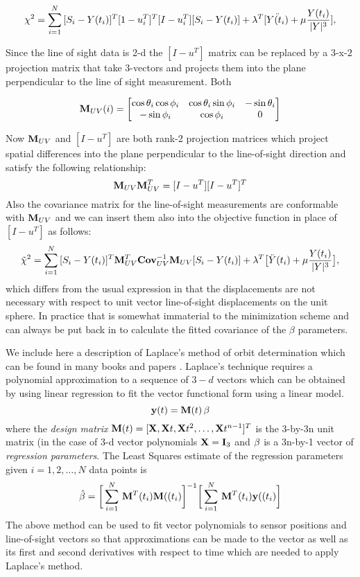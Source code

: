 $$\chi^2 = \sum_{i=1}^N\, [S_i - Y(t_i)]^T [1-u_i^T]^T [I-u_i^T][S_i - Y(t_i)]  + \lambda^T[\ddot{Y(t_i)} + \mu {Y(t_i)\over |Y|^3}],$$

Since the line of sight data is 2-d the $[I-u^T]$ matrix can be replaced by a $3$-x-$2$ projection matrix that take 3-vectors and projects them into the plane perpendicular to the line of sight measurement. Both

$${\bf M}_{UV}(i) =
\begin{bmatrix}
\cos\theta_i\cos\phi_i & \cos\theta_i\sin\phi_i & -\sin\theta_i \\
-\sin\phi_i & \cos\phi_i & 0\\
\end{bmatrix}
$$

Now ${\bf M}_{UV}$ and $[I - u^T]$ are both rank-2 projection matrices which project spatial differences into the plane perpendicular to the line-of-sight direction and satisfy the following relationship: 
$${\bf M}_{UV} {\bf M}^T_{UV} = [I - u^T][I-u^T]^T$$Also the covariance matrix for the line-of-sight measurements are conformable with ${\bf M}_{UV}$ and we can insert them also into the objective function in place of $[I-u^T]$ as follows:
$$\tilde{\chi}^2 = \sum_{i=1}^N\, [S_i - Y(t_i)]^T {\bf M}^T_{UV}{\bf Cov}^{-1}_{UV} {\bf M}_{UV} [S_i - Y(t_i)]  + \lambda^T\big[\ddot{Y}(t_i) + \mu {Y(t_i)\over |Y|^3}\big],$$ which differs from the usual expression in that the displacements are not necessary with respect to unit vector line-of-sight displacements on the unit sphere. In practice that is somewhat immaterial to the minimization scheme and can always be put back in to calculate the fitted covariance of the $\beta$ parameters. 

We include here a description of Laplace's method of orbit determination which can be found in many books\cite{Bate} and papers \cite{Bell}. Laplace's technique requires a polynomial approximation to a sequence of $3-d$ vectors which can be obtained by using linear regression to fit the vector functional form using a linear model\cite{Rencher}.
$${\bf y}(t) = {\bf M(}t)\, {\bf \beta}$$where the {\it design matrix} ${\bf M}(t) = [{\bf X},{\bf X}t,{\bf X}t^2,\hdots,{\bf X}t^{n-1}]^T$ is the 3-by-3n unit matrix (in the case of 3-d vector polynomials ${\bf X}  = {\bf I}_3$ and $\bf \beta$ is a 3n-by-1 vector of {\it regression parameters}. The Least Squares estimate of the regression parameters given $i=1,2,\hdots, N$ data points is 
$$\hat{\beta} = \bigg[\sum_{i=1}^N\, {\bf M}^T(t_i) {\bf M}((t_i)\bigg]^{-1}\bigg[\sum_{i=1}^N\, {\bf M}^T(t_i) {\bf y}((t_i)\bigg]$$ The above method can be used to fit vector polynomials to sensor positions and line-of-sight vectors so that approximations can be made to the vector as well as its first and second derivatives with respect to time which are needed to apply Laplace's method.\\ 

